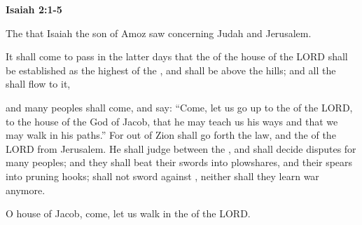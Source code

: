 \documentclass[11pt]{article}
\begin{document}
\begin{center}
{\Huge\bfseries Isaiah 2:1-5}
\end{center}
\vspace{10pt}

\newpage{}

\begin{biblicaloutline}[Isaiah 2:1-5]
    

    \begin{versesection}{2em}
         The  that Isaiah the son of Amoz saw concerning Judah and Jerusalem.
    \end{versesection}
    
    
    \begin{versesection}{2em}
         It shall come to pass in the latter days
        \poetryline that the  of the house of the LORD
        shall be established as the highest of the ,
        \poetryline and shall be  above the hills;
        and all the  shall flow to it,
        
        \poetryline  and many peoples shall come, and say:
        ``Come, let us go up to the  of the LORD,
        \poetryline to the house of the God of Jacob,
        that he may teach us his ways
        \poetryline and that we may walk in his paths.''
        For out of Zion shall go forth the law,
        \poetryline and the  of the LORD from Jerusalem.
         He shall judge between the ,
        \poetryline and shall decide disputes for many peoples;
        and they shall beat their swords into plowshares,
        \poetryline and their spears into pruning hooks;
         shall not  sword against ,
        \poetryline neither shall they learn war anymore.
        
         O house of Jacob,
        \poetryline come, let us walk
        \poetryline in the  of the LORD.
    \end{versesection}

\end{biblicaloutline}
\end{document}
